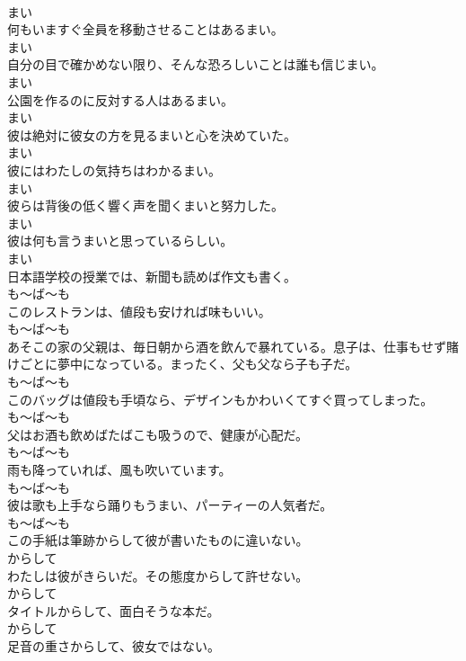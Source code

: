 \documentclass[8pt]{extreport}
\begin{document}
\begin{CJK}{UTF8}{min}
\\	まい
\\	何もいますぐ全員を移動させることはあるまい。	
\\	まい
\\	自分の目で確かめない限り、そんな恐ろしいことは誰も信じまい。	
\\	まい
\\	公園を作るのに反対する人はあるまい。	
\\	まい
\\	彼は絶対に彼女の方を見るまいと心を決めていた。	
\\	まい
\\	彼にはわたしの気持ちはわかるまい。	
\\	まい
\\	彼らは背後の低く響く声を聞くまいと努力した。	
\\	まい
\\	彼は何も言うまいと思っているらしい。	
\\	まい
\\	日本語学校の授業では、新聞も読めば作文も書く。	
\\	も～ば～も
\\	このレストランは、値段も安ければ味もいい。	
\\	も～ば～も
\\	あそこの家の父親は、毎日朝から酒を飲んで暴れている。息子は、仕事もせず賭けごとに夢中になっている。まったく、父も父なら子も子だ。	
\\	も～ば～も
\\	このバッグは値段も手頃なら、デザインもかわいくてすぐ買ってしまった。	
\\	も～ば～も
\\	父はお酒も飲めばたばこも吸うので、健康が心配だ。	
\\	も～ば～も
\\	雨も降っていれば、風も吹いています。	
\\	も～ば～も
\\	彼は歌も上手なら踊りもうまい、パーティーの人気者だ。	
\\	も～ば～も
\\	この手紙は筆跡からして彼が書いたものに違いない。	
\\	からして
\\	わたしは彼がきらいだ。その態度からして許せない。	
\\	からして
\\	タイトルからして、面白そうな本だ。	
\\	からして
\\	足音の重さからして、彼女ではない。	

\end{CJK}
\end{document}
